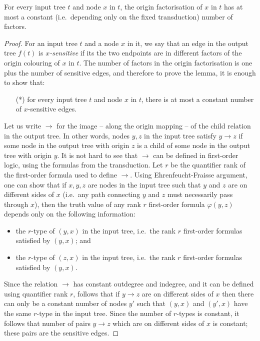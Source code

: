 \begin{lemma}\label{lem:composition-method}
    For every input tree $t$ and node $x$ in $t$, the origin factorisation of $x$ in $t$ has at most a constant (i.e.~depending only on the fixed transduction) number of  factors. 
\end{lemma}
\begin{proof}
    For an input tree $t$ and a node $x$ in it, we say that an edge in the output tree $f(t)$ is \emph{$x$-sensitive} if its  the two endpoints are in  different factors of  the origin colouring of $x$ in $t$.  The number of factors in the origin factorisation is one plus the  number of sensitive edges, and therefore to prove the lemma, it is enough to show that:
    \begin{itemize}
        \item[(*)] for every input tree $t$ and node $x$ in $t$,  there is at most a constant  number of $x$-sensitive edges.
    \end{itemize}
    
    Let us write  $\to$ for the image -- along the origin mapping -- of the  child relation in the output tree. In other words,  nodes $y,z$ in the input tree satisfy $y \to z$ if some node in the output tree with origin $z$ is a child of some node in the output tree with origin $y$.   
     It is not hard to  see that $\to$ can be defined in first-order logic, using the formulas from the transduction. Let $r$ be the quantifier rank of the first-order formula used to define $\to$. Using Ehrenfeucht-Fraisse argument, one can show that  if $x,y,z$ are nodes in the input tree such that $y$ and $z$ are on different sides of $x$ (i.e.~any path connecting $y$ and $z$ must necessarily pass through $x$),
    then the truth value of any rank $r$ first-order formula $\varphi(y,z)$   depends only on the following information:
    \begin{itemize}
        \item the $r$-type of  $(y,x)$ in the input tree, i.e.~the rank $r$ first-order formulas satisfied by $(y,x)$; and
         \item the $r$-type of  $(z,x)$ in the input tree, i.e.~the rank $r$ first-order formulas satisfied by $(y,x)$.
        \end{itemize}
    Since the relation $\to$ has constant outdegree and indegree, and it can be defined using quantifier rank $r$,  follows that if $y\to z$ are on different sides of $x$ then there can only be a constant number of nodes $y'$ such that $(y,x)$ and $(y',x)$ have the same $r$-type in the input tree. Since the number of $r$-types is constant, it follows that number of pairs $y \to z$ which are on different sides of $x$ is constant; these pairs are the sensitive edges. 
\end{proof}


